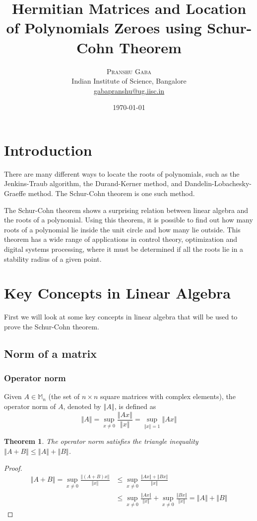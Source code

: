 \documentclass[twoside]{article}
\author{%
\textsc{Pranshu Gaba}  \\[1ex]
\normalsize Indian Institute of Science, Bangalore \\
\normalsize \href{mailto:gabapranshu@iisc.ac.in}{gabapranshu@ug.iisc.in}}
\title{Hermitian Matrices and Location of Polynomials Zeroes using Schur-Cohn Theorem}
\date{\today}
\newcommand*\norm[1]{\left \Vert #1 \right\Vert}
\theoremstyle{plain}
\newtheorem{theorem}{Theorem}
\theoremstyle{definition}
\theoremstyle{remark}
\begin{document}
\maketitle

\section{Introduction}


There are many different ways to locate the roots of polynomials, such as the Jenkins-Traub algorithm, the Durand-Kerner method, and Dandelin-Lobachesky-Graeffe method. The Schur-Cohn theorem is one such method. 

The Schur-Cohn theorem shows a surprising relation between linear algebra and the roots of a polynomial. Using this theorem, it is possible to find out how many roots of a polynomial lie inside the  unit circle and how many lie outside. This theorem has a wide range of applications in control theory, optimization and digital systems processing, where it must be determined if all the roots lie in a stability radius of a given point. 


\section{Key Concepts in Linear Algebra}
First we will look at some key concepts in linear algebra that will be used to prove the Schur-Cohn theorem.
\subsection{Norm of a matrix}

\subsubsection{Operator norm}
Given \(A \in \mathbb{M}_n\) (the set of \(n \times n\) square matrices with complex elements), the operator norm of \(A\), denoted by \(\norm{A}\), is defined as \[\norm{A} =\displaystyle \sup _{x \neq 0} \frac{\norm{Ax}}{\norm{x}} = \sup_{\norm{x} = 1} \norm{Ax} \]

\begin{theorem} The operator norm satisfies the triangle inequality \(\norm{A + B} \leq \norm{A} + \norm{B}\). \end{theorem}
\begin{proof} \begin{equation*} \begin{split}
\norm{A + B}  = \sup _{x \ne 0} \frac{\norm{(A + B) x}}{\norm{x}} & \le \sup_{x \ne 0} \frac{\norm{Ax} +\norm{Bx}}{\norm{x}} \\
& \le \sup_{x \ne 0} \frac{\norm{Ax}}{\norm{x}} + \sup_{x \ne 0} \frac{\norm{Bx}}{\norm{x}} = \norm{A} + \norm{B}
\end{split} \end{equation*} \end{proof}
\end{document}
